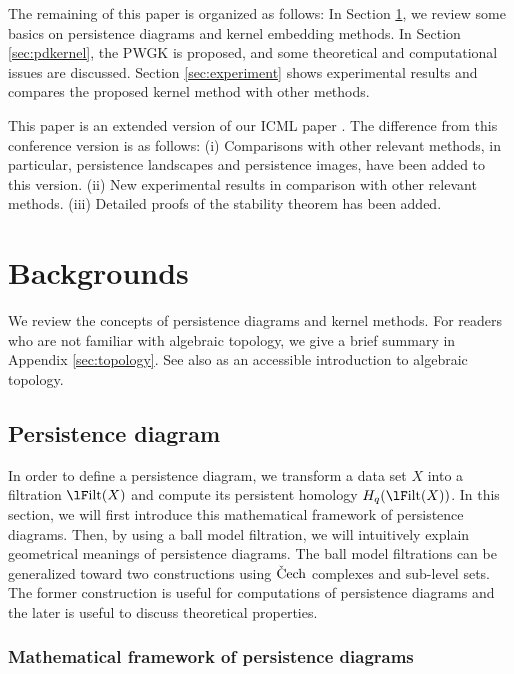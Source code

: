 \documentclass{article}
\newcommand{\cech}{{\rm \check{C}ech}}
\newcommand{\Filt}{{\rm {\lF}ilt}}
\begin{document}
The remaining of this paper is organized as follows:
In Section \ref{sec:background}, we review some basics on persistence diagrams and kernel embedding methods.
In Section \ref{sec:pdkernel},  the PWGK is proposed, and some theoretical and computational issues are discussed.
Section \ref{sec:experiment} shows experimental results and compares the proposed kernel method with other methods.

This paper is an extended version of our ICML paper \cite{KFH16}.
The difference from this conference version is as follows:
(i) Comparisons with other relevant methods, in particular, persistence landscapes and persistence images, have been added to this version.
(ii) New experimental results in comparison with other relevant methods.
(iii) Detailed proofs of the stability theorem has been added.

\section{Backgrounds}
\label{sec:background}

We review the concepts of persistence diagrams and kernel methods.  For readers who are not familiar with algebraic topology, we give a brief summary in Appendix \ref{sec:topology}.  See also \cite{Ha02} as an accessible introduction to algebraic topology.

\subsection{Persistence diagram}
\label{subsec:persistence_diagram}

In order to define a persistence diagram, we transform a data set $X$ into a filtration $\Filt(X)$ and compute its persistent homology $H_{q}(\Filt(X))$.
In this section, we will first introduce this mathematical framework of persistence diagrams. Then, by using a ball model filtration, we will intuitively explain geometrical meanings of persistence diagrams.
The ball model filtrations can be generalized toward two constructions using $\cech$ complexes and sub-level sets.
The former construction is useful for computations of persistence diagrams and the later is useful to discuss theoretical properties.

\subsubsection{Mathematical framework of persistence diagrams}
\end{document}
